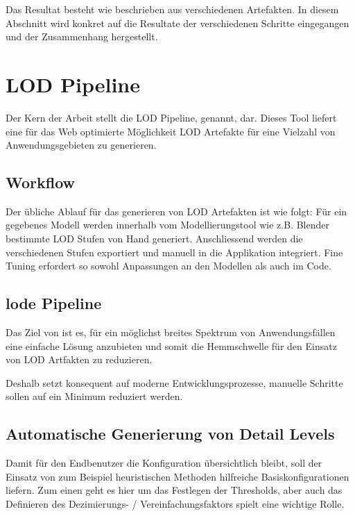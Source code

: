 Das Resultat besteht wie beschrieben aus verschiedenen Artefakten. In diesem Abschnitt wird konkret auf die Resultate der verschiedenen Schritte eingegangen und der Zusammenhang hergestellt.

\section{LOD Pipeline}

Der Kern der Arbeit stellt die LOD Pipeline,  genannt, dar. Dieses Tool liefert eine für das Web optimierte Möglichkeit LOD Artefakte für eine Vielzahl von Anwendungsgebieten zu generieren.

\subsection{Workflow}

Der übliche Ablauf für das generieren von LOD Artefakten ist wie folgt:
Für ein gegebenes Modell werden innerhalb vom Modellierungstool wie z.B. Blender bestimmte LOD Stufen von Hand generiert. Anschliessend werden die verschiedenen Stufen exportiert und manuell in die Applikation integriert. Fine Tuning erfordert so sowohl Anpassungen an den Modellen als auch im Code.

\subsection{lode Pipeline}

Das Ziel von  ist es, für ein möglichst breites Spektrum von Anwendungsfällen eine einfache Lösung anzubieten und somit die Hemmschwelle für den Einsatz von LOD Artfakten zu reduzieren.

Deshalb setzt  konsequent auf moderne Entwicklungsprozesse, manuelle Schritte sollen auf ein Minimum reduziert werden.

\subsection{Automatische Generierung von Detail Levels}
Damit für den Endbenutzer die Konfiguration übersichtlich bleibt, soll der Einsatz von zum Beispiel heuristischen Methoden hilfreiche Basiskonfigurationen liefern.
Zum einen geht es hier um das Festlegen der Thresholds, aber auch das Definieren des Dezimierungs- / Vereinfachungsfaktors spielt eine wichtige Rolle.


